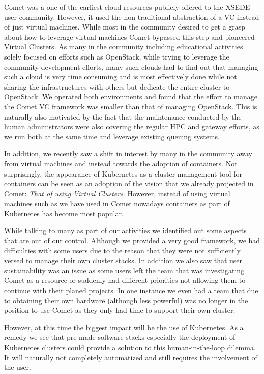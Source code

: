 \documentclass[sigconf,hyphens]{acmart}
\begin{document}
Comet was a one of the earliest cloud resources publicly offered to
the XSEDE user community. However, it used the non traditional
abstraction of a VC instead of just virtual machines. While most in
the community desired to get a grasp about how to leverage virtual
machines Comet bypassed this step and pioneered Virtual Clusters. As
many in the community including educational activities solely focused
on efforts such as OpenStack, while trying to leverage the community
development efforts, many such clouds had to find out that managing
such a cloud is very time consuming and is most effectively done while
not sharing the infrastructures with others but dedicate the entire
cluster to OpenStack. We operated both environments and found that the
effort to manage the Comet VC framework was smaller than that of
managing OpenStack. This is naturally also motivated by the fact that
the maintenance conducted by the human administrators were also
covering the regular HPC and gateway efforts, as we run both at the
same time and leverage existing queuing systems.

In addition, we recently saw a shift in interest by many in the
community away from virtual machines and instead towards the adoption
of containers. Not surprisingly, the appearance of Kubernetes as a
cluster management tool for containers can be seen as an adoption of
the vision that we already projected in Comet: {\em That of using
  Virtual Clusters}. However, instead of using virtual machines such
as we have used in Comet nowadays containers as part of Kubernetes has
become most popular.

While talking to many as part of our activities we identified out some
aspects that are out of our control. Although we provided a very good
framework, we had difficulties with some users due to the reason that
they were not sufficiently versed to manage their own cluster stacks.
In addition we also saw that user sustainability was an issue as some
users left the team that was investigating Comet as a resource or
suddenly had different priorities not allowing them to continue with
their planed projects. In one instance we even had a team that due to
obtaining their own hardware (although less powerful) was no longer in
the position to use Comet as they only had time to support their own
cluster.

However, at this time the biggest impact will be the use of
Kubernetes. As a remedy we see that pre-made software stacks
especially the deployment of Kubernetes clusters could provide a
solution to this human-in-the-loop dilemma. It will naturally not
completely automatized and still requires the involvement of the user.
\end{document}
